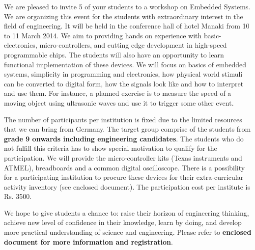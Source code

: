 \documentclass[11pt,stdletter,dateno,sigleft]{newlfm} %
\begin{document}
\begin{newlfm}

We are pleased to invite 5 of your students to a workshop on Embedded Systems. We are organizing this event for the students with extraordinary interest in the field of engineering. It will be held in the conference hall of hotel Manaki from 10 to 11 March 2014. We aim to providing hands on experience with basic-electronics, micro-controllers, and cutting edge development in high-speed programmable chips. The students will also have an opportunity to learn functional implementation of these devices. We will focus on basics of embedded systems, simplicity in programming and electronics, how physical world stimuli can be converted to digital form, how the signals look like and how to interpret and use them. For instance, a planned exercise is to measure the speed of a moving object using ultrasonic waves and use it to trigger some other event.
 
The number of participants per institution is fixed due to the limited resources that we can bring from Germany. The target group comprise of the students from \textbf{grade 9 onwards including engineering candidates}. The students who do not fulfill this criteria has to show special motivation to qualify for the participation. We will provide the micro-controller kits (Texas instruments and ATMEL), breadboards  and a common digital oscilloscope. There is a possibility for a participating institution to procure these devices for their extra-curricular activity inventory (see enclosed document). The participation cost per institute is Rs. 3500. 

We hope to give students a chance to: raise their horizon of engineering thinking, achieve new level of confidence in their knowledge, learn by doing, and develop more practical understanding of science and engineering. Please refer to \textbf{enclosed document for more information and registration}.\\[5pt]
\end{newlfm}
\end{document}
